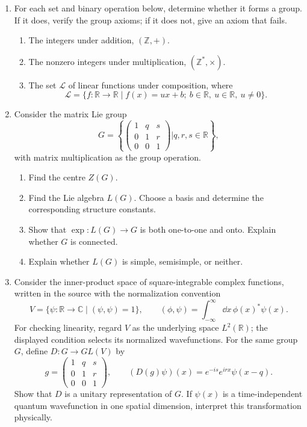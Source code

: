 \begin{enumerate}
\begin{enumerate}
\item[(a)] For each set and binary operation below, determine whether it
forms a group.  If it does, verify the group axioms; if it does not, give
an axiom that fails.
  \begin{enumerate}
  \item[(i)] The integers under addition, \((\mathbb Z,+)\).
  \item[(ii)] The nonzero integers under multiplication,
  \((\mathbb Z^*,\times)\).
  \item[(iii)] The set \(\mathcal L\) of linear functions under
  composition, where
  \[
   \mathcal L=\{f:\mathbb R\to\mathbb R\mid
   f(x)=ux+b;\ b\in\mathbb R,\ u\in\mathbb R,\ u\ne0\}.
  \]
  \end{enumerate}
\item[(b)] Consider the matrix Lie group
\[
 G=\left\{
 \begin{pmatrix}1&q&s\\0&1&r\\0&0&1\end{pmatrix}
 \mathrel{\Big|}q,r,s\in\mathbb R
 \right\},
\]
with matrix multiplication as the group operation.
  \begin{enumerate}
  \item[(i)] Find the centre \(Z(G)\).
  \item[(ii)] Find the Lie algebra \(L(G)\).  Choose a basis and determine
  the corresponding structure constants.
  \item[(iii)] Show that \(\exp:L(G)\to G\) is both one-to-one and onto.
  Explain whether \(G\) is connected.
  \item[(iv)] Explain whether \(L(G)\) is simple, semisimple, or neither.
  \end{enumerate}
\item[(c)] Consider the inner-product space of square-integrable complex
functions, written in the source with the normalization convention
\[
 V=\{\psi:\mathbb R\to\mathbb C\mid(\psi,\psi)=1\},\qquad
 (\phi,\psi)=\int_{-\infty}^{\infty}\dd x\,\phi(x)^*\psi(x).
\]
For checking linearity, regard \(V\) as the underlying space
\(L^2(\mathbb R)\); the displayed condition selects its normalized
wavefunctions.  For the same group \(G\), define \(D:G\to GL(V)\) by
\[
 g=\begin{pmatrix}1&q&s\\0&1&r\\0&0&1\end{pmatrix},\qquad
 (D(g)\psi)(x)=e^{-is}e^{irx}\psi(x-q).
\]
Show that \(D\) is a unitary representation of \(G\).  If \(\psi(x)\)
is a time-independent quantum wavefunction in one spatial dimension,
interpret this transformation physically.
\end{enumerate}


\end{enumerate}
